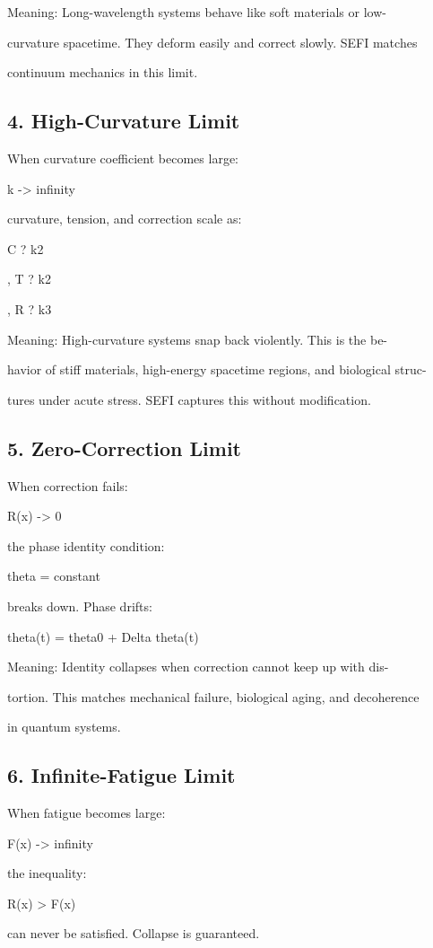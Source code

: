 \documentclass[10pt]{article}
\begin{document}
Meaning: Long-wavelength systems behave like soft materials or low-

curvature spacetime. They deform easily and correct slowly. SEFI matches

continuum mechanics in this limit.

\subsection*{4. High-Curvature Limit}
When curvature coefficient becomes large:

k -> infinity

curvature, tension, and correction scale as:

C ? k2

, T ? k2

, R ? k3

Meaning: High-curvature systems snap back violently. This is the be-

havior of stiff materials, high-energy spacetime regions, and biological struc-

tures under acute stress. SEFI captures this without modification.


\subsection*{5. Zero-Correction Limit}
When correction fails:

R(x) -> 0

the phase identity condition:

theta = constant

breaks down. Phase drifts:

theta(t) = theta0 + Delta theta(t)

Meaning: Identity collapses when correction cannot keep up with dis-

tortion. This matches mechanical failure, biological aging, and decoherence

in quantum systems.

\subsection*{6. Infinite-Fatigue Limit}
When fatigue becomes large:

F(x) -> infinity

the inequality:

R(x) > F(x)

can never be satisfied. Collapse is guaranteed.
\end{document}
